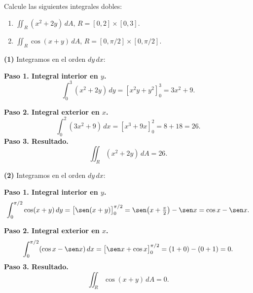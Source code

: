 \begin{prob}
Calcule las siguientes integrales dobles:
\begin{enumerate}
    \item $\displaystyle\iint_R (x^2+2y)\,dA$, $R=[0,2]\times[0,3]$.
    \item $\displaystyle\iint_R \cos(x+y)\,dA$, $R=[0,\pi/2]\times[0,\pi/2]$.
\end{enumerate}
\begin{myproof}
\textbf{(1)} Integramos en el orden $dy\,dx$:

\textbf{Paso 1. Integral interior en $y$.}
\[
\int_0^3 (x^2+2y)\,dy = \left[x^2 y + y^2\right]_0^3 = 3x^2 + 9.
\]

\textbf{Paso 2. Integral exterior en $x$.}
\[
\int_0^2 (3x^2+9)\,dx = \left[x^3+9x\right]_0^2 = 8+18 = 26.
\]
\textbf{Paso 3. Resultado.}
\[
\boxed{\iint_R (x^2+2y)\,dA = 26.}
\]

\textbf{(2)} Integramos en el orden $dy\,dx$:

\textbf{Paso 1. Integral interior en $y$.}
\[
\int_0^{\pi/2} \cos(x+y)\,dy = \bigl[\sen(x+y)\bigr]_0^{\pi/2} = \sen\!\left(x+\tfrac{\pi}{2}\right)-\sen x = \cos x - \sen x.
\]

\textbf{Paso 2. Integral exterior en $x$.}
\[
\int_0^{\pi/2}(\cos x - \sen x)\,dx = \bigl[\sen x + \cos x\bigr]_0^{\pi/2}
= (1+0)-(0+1) = 0.
\]
\textbf{Paso 3. Resultado.}
\[
\boxed{\iint_R \cos(x+y)\,dA = 0.}
\]
\end{myproof}
\end{prob}

